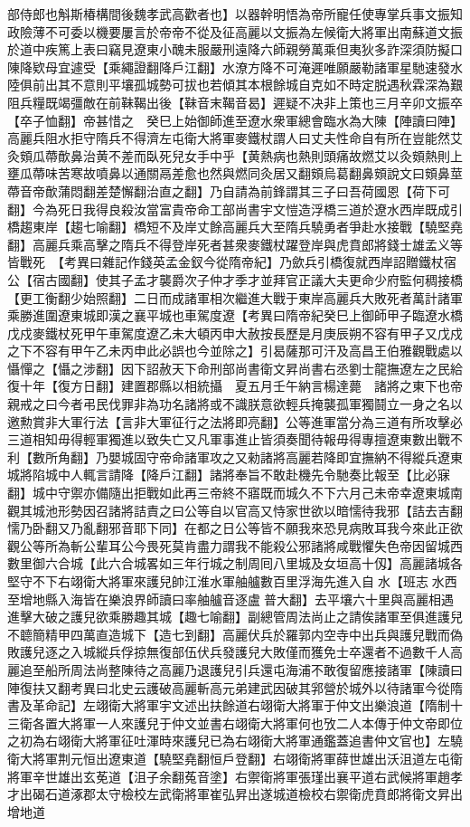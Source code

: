 部侍郎也斛斯椿構間後魏孝武高歡者也】以器幹明悟為帝所寵任使專掌兵事文振知政險薄不可委以機要屢言於帝帝不從及征高麗以文振為左候衛大將軍出南蘇道文振於道中疾篤上表曰竊見遼東小醜未服嚴刑遠降六師親勞萬乘但夷狄多詐深須防擬口陳降欵母宜遽受【乘繩證翻降戶江翻】水潦方降不可淹遲唯願嚴勒諸軍星馳速發水陸俱前出其不意則平壤孤城勢可拔也若傾其本根餘城自克如不時定脱遇秋霖深為艱阻兵糧既竭彊敵在前靺鞨出後【靺音末鞨音曷】遲疑不决非上策也三月辛卯文振卒【卒子恤翻】帝甚惜之　癸巳上始御師進至遼水衆軍總會臨水為大陳【陣讀曰陣】高麗兵阻水拒守隋兵不得濟左屯衛大將軍麥鐵杖謂人曰丈夫性命自有所在豈能然艾灸頞瓜蔕歕鼻治黄不差而臥死兒女手中乎【黄熱病也熱則頭痛故燃艾以灸頞熱則上壅瓜蔕味苦寒故噴鼻以通關鬲差愈也然與燃同灸居又翻頞烏葛翻鼻頞說文曰頞鼻莖蔕音帝歕蒲悶翻差楚懈翻治直之翻】乃自請為前鋒謂其三子曰吾荷國恩【荷下可翻】今為死日我得良殺汝當富貴帝命工部尚書宇文愷造浮橋三道於遼水西岸既成引橋趨東岸【趨七喻翻】橋短不及岸丈餘高麗兵大至隋兵驍勇者爭赴水接戰【驍堅堯翻】高麗兵乘高擊之隋兵不得登岸死者甚衆麥鐵杖躍登岸與虎賁郎將錢士雄孟义等皆戰死　【考異曰雜記作錢英孟金釵今從隋帝紀】乃歛兵引橋復就西岸詔贈鐵杖宿公【宿古國翻】使其子孟才襲爵次子仲才季才並拜官正議大夫更命少府監何稠接橋【更工衡翻少始照翻】二日而成諸軍相次繼進大戰于東岸高麗兵大敗死者萬計諸軍乘勝進圍遼東城即漢之襄平城也車駕度遼【考異曰隋帝紀癸巳上御師甲子臨遼水橋戊戍麥鐵杖死甲午車駕度遼乙未大頓丙申大赦按長歷是月庚辰朔不容有甲子又戊戍之下不容有甲午乙未丙申此必誤也今並除之】引曷薩那可汗及高昌王伯雅觀戰處以懾憚之【懾之涉翻】因下詔赦天下命刑部尚書衛文昇尚書右丞劉士龍撫遼左之民給復十年【復方日翻】建置郡縣以相統攝　夏五月壬午納言楊達薨　諸將之東下也帝親戒之曰今者弔民伐罪非為功名諸將或不識朕意欲輕兵掩襲孤軍獨鬪立一身之名以邀勲賞非大軍行法【言非大軍征行之法將即亮翻】公等進軍當分為三道有所攻擊必三道相知毋得輕軍獨進以致失亡又凡軍事進止皆須奏聞待報毋得專擅遼東數出戰不利【數所角翻】乃嬰城固守帝命諸軍攻之又勑諸將高麗若降即宜撫納不得縱兵遼東城將陷城中人輒言請降【降戶江翻】諸將奉旨不敢赴機先令馳奏比報至【比必寐翻】城中守禦亦備隨出拒戰如此再三帝終不寤既而城久不下六月己未帝幸遼東城南觀其城池形勢因召諸將詰責之曰公等自以官高又恃家世欲以暗懦待我邪【詰去吉翻懦乃卧翻又乃亂翻邪音耶下同】在都之日公等皆不願我來恐見病敗耳我今來此正欲觀公等所為斬公輩耳公今畏死莫肯盡力謂我不能殺公邪諸將咸戰懼失色帝因留城西數里御六合城【此六合城畧如三年行城之制周囘八里城及女垣高十仭】高麗諸城各堅守不下右翊衛大將軍來護兒帥江淮水軍舳艫數百里浮海先進入自水【班志水西至增地縣入海皆在樂浪界師讀曰率舳艫音逐盧普大翻】去平壤六十里與高麗相遇進擊大破之護兒欲乘勝趣其城【趣七喻翻】副總管周法尚止之請俟諸軍至俱進護兒不聼簡精甲四萬直造城下【造七到翻】高麗伏兵於羅郭内空寺中出兵與護兒戰而偽敗護兒逐之入城縱兵俘掠無復部伍伏兵發護兒大敗僅而獲免士卒還者不過數千人高麗追至船所周法尚整陳待之高麗乃退護兒引兵還屯海浦不敢復留應接諸軍【陳讀曰陣復扶又翻考異曰北史云護破高麗斬高元弟建武因破其郛營於城外以待諸軍今從隋書及革命記】左翊衛大將軍宇文述出扶餘道右翊衛大將軍于仲文出樂浪道【隋制十三衛各置大將軍一人來護兒于仲文並書右翊衛大將軍何也攷二人本傳于仲文帝即位之初為右翊衛大將軍征吐渾時來護兒已為右翊衛大將軍通鑑蓋追書仲文官也】左驍衛大將軍荆元恒出遼東道【驍堅堯翻恒戶登翻】右翊衛將軍薛世雄出沃沮道左屯衛將軍辛世雄出玄莬道【沮子余翻菟音塗】右禦衛將軍張瑾出襄平道右武候將軍趙孝才出碣石道涿郡太守檢校左武衛將軍崔弘昇出遂城道檢校右禦衛虎賁郎將衛文昇出增地道